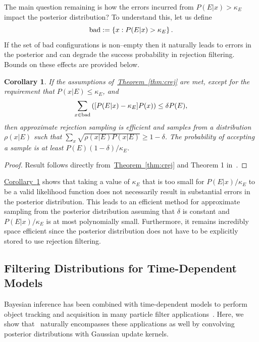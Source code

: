 \documentclass[twoside]{article}
\newtheorem{corollary}{Corollary}
\newcommand{\thm}[1]{\hyperref[thm:#1]{Theorem~\ref*{thm:#1}}}
\newcommand{\cor}[1]{\hyperref[cor:#1]{Corollary~\ref*{cor:#1}}}
\newcommand{\CRej}{\text{rejection filtering}}
\begin{document}
The main question remaining is how  the
errors incurred from $P(E|x) > \kappa_E$ impact the posterior distribution?  To understand this, let us define
\begin{equation}
{\rm bad} := \left\{x: {P(E|x)} >{\kappa_E}\right\}.
\end{equation}
If the set of bad configurations is non--empty then it naturally leads to errors in the posterior and
can degrade the success probability in rejection filtering.  Bounds on these effects are
provided below.

\begin{corollary}\label{cor:badalgorithm}
If the assumptions of~\thm{crej} are met, except for the requirement that $P(x|E) \le \kappa_E$, and
$$\sum_{x\in {\rm bad}}  \left([P(E|x)-\kappa_E] P(x)\right) \le \delta P(E),$$
  then approximate rejection sampling is  efficient and samples from a distribution $\rho(x|E)$ such that ${\sum_x \sqrt{\rho(x|E) P(x|E)}} \ge 1-\delta$.
The probability of accepting a sample is at least ${P(E) (1-\delta)}/{\kappa_E}$.\label{thm:kappa}
\end{corollary}
\begin{proof}
Result follows directly from~\thm{crej} and Theorem 1 in~\cite{WKGS15}.
\end{proof}

\cor{badalgorithm} shows that taking a value of $\kappa_E$ that is too small for $P(E|x)/\kappa_E$ to be a valid likelihood function does not necessarily result in substantial errors in the posterior distribution.  This leads to an efficient method for approximate sampling from the posterior distribution assuming that $\delta$ is constant and $P(E|x)/\kappa_E$ is at most polynomially small.  Furthermore, it remains incredibly space efficient since the posterior distribution does not have to be explicitly stored to use rejection filtering.

\subsection{Filtering Distributions for Time-Dependent Models}
\label{sec:time-dep}

Bayesian inference has been combined with
time-dependent models 
to perform object tracking and acquisition in many particle filter applications~\cite{isard_condensationconditional_1998,gustafsson_particle_2002}. Here, we show that
\CRej~naturally encompasses these applications as well by convolving posterior
distributions with Gaussian update kernels.
\end{document}
